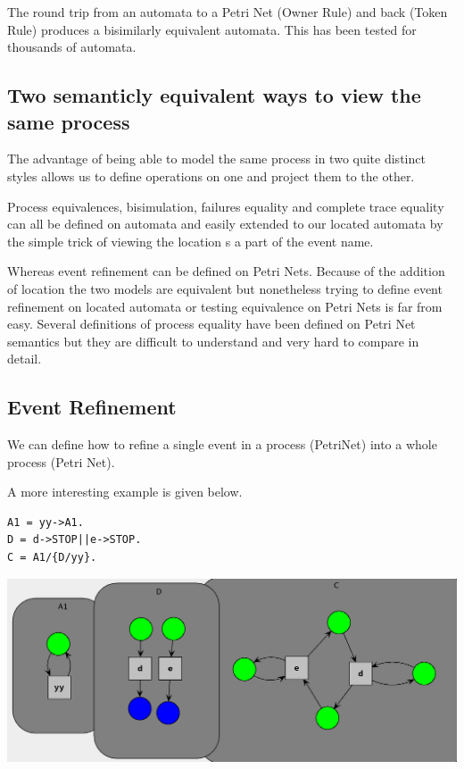 \documentclass[]{article}
\begin{document}
 The round trip from an automata to a Petri Net (Owner Rule) and back  (Token Rule) produces a bisimilarly  equivalent automata. This has been tested for thousands of automata.

\subsection*{Two semanticly equivalent ways to view the same process}
The advantage of being able to model the same process in two quite distinct styles allows us to define operations on one and project them to the other.

Process equivalences, bisimulation, failures equality and complete trace equality can all be defined on automata and easily extended to our {\sf located automata} by the simple trick of viewing the location s a part of the event name.

Whereas event refinement can be defined on Petri Nets.  Because of the addition of location the two models are equivalent but nonetheless trying to define event refinement on located automata or testing equivalence on Petri Nets is far from easy.  Several definitions of process equality have been defined on Petri Net semantics but they are difficult to understand and very hard to compare in detail. 


\subsection*{Event Refinement}
We can define how to refine a single  event in a process (PetriNet) into a whole process (Petri Net). 

A more interesting example is given below.

\noindent
\begin{minipage}{0.25\textwidth}
\begin{verbatim}
A1 = yy->A1.
D = d->STOP||e->STOP.
C = A1/{D/yy}.
  \end{verbatim}
\end{minipage}\begin{minipage}{0.7\textwidth}
\begin{center}\includegraphics[scale=0.4]{Wings.png}\end{center}
\end{minipage}
\end{document}
